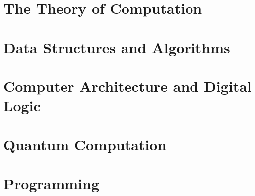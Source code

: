 \documentclass[11pt,twoside=semi,openright,numbers=noenddot,titlepage=false]{scrbook}
\begin{document}
\part{The Theory of Computation}\label{part:theoretical}
\parttoc{}

% 
% 
% 
% 
% 
% 
% 
% 
% 
% 
% 
% 
% 
% 


\part{Data Structures and Algorithms}\label{part:dsa}
\parttoc{}
% 
% 
% 
% 
% 
% 
% 
% 


\part{Computer Architecture and Digital Logic}\label{part:architecture}
\parttoc{}
% 
% 
% 
% 
% 


\part{Quantum Computation}\label{part:quantum}
\parttoc{}
% 
% 
% 
% 
% 


\part{Programming}\label{part:programming}
\parttoc{}
% 
% 
% 
% 
% 
% 
\end{document}
